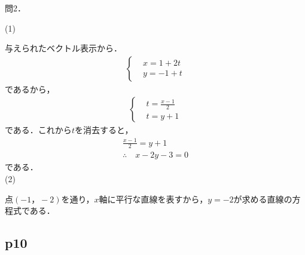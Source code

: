 \documentclass[dvipdfmx,uplatex,11pt]{jsarticle}
\begin{document}
		\newpage

		問2．
		
		\begin{leftbar}
			(1) \par
			与えられたベクトル表示から．
			\begin{align*}
				\begin{cases}
					&x=1+2t \\
					&y=-1+t
				\end{cases}
			\end{align*}
			であるから，
			\begin{align*}
				\begin{cases}
					&t=\frac{x-1}{2} \\
					&t=y+1
				\end{cases}
			\end{align*}
			である．これから$t$を消去すると，
			\begin{gather*}
				\frac{x-1}{2} = y+1 \\
				\therefore \quad x-2y-3 =0
			\end{gather*}
			である．\\

			(2) \par 
			点$(-1，-2)$を通り，$x$軸に平行な直線を表すから，$y=-2$が求める直線の方程式である．
		\end{leftbar}
%
\newpage
%
%
%
\subsection{p10}
%
\end{document}
